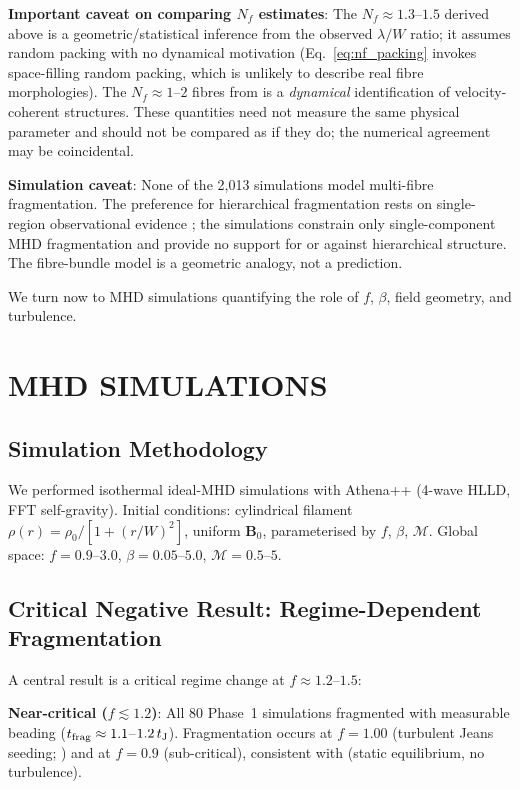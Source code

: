 \documentclass[twoside,twocolumn]{mnras}
\begin{document}
\textbf{Important caveat on comparing $N_f$ estimates}: The $N_f \approx 1.3$--$1.5$
derived above is a geometric/statistical inference from the observed $\lambda/W$ ratio;
it assumes random packing with no dynamical motivation (Eq.~\ref{eq:nf_packing}
invokes space-filling random packing, which is unlikely to describe real fibre
morphologies). The $N_f \approx 1$--$2$ fibres from \citet{Hacar2018} is a
\textit{dynamical} identification of velocity-coherent structures. These quantities
need not measure the same physical parameter and should not be compared as if
they do; the numerical agreement may be coincidental.

\textbf{Simulation caveat}: None of the 2,013 simulations model multi-fibre
fragmentation. The preference for hierarchical fragmentation rests on single-region
observational evidence \citep{Yang2024}; the simulations constrain only
single-component MHD fragmentation and provide no support for or against hierarchical
structure. The fibre-bundle model is a geometric analogy, not a prediction.

We turn now to MHD simulations quantifying the role of $f$, $\beta$, field geometry,
and turbulence.

\section{MHD SIMULATIONS}

\subsection{Simulation Methodology}

We performed isothermal ideal-MHD simulations with Athena++ \citep{Stone2020}
(4-wave HLLD, FFT self-gravity). Initial conditions: cylindrical filament
$\rho(r) = \rho_0/[1+(r/W)^2]$, uniform $\mathbf{B}_0$, parameterised by $f$, $\beta$,
$\mathcal{M}$. Global space: $f=0.9$--$3.0$, $\beta=0.05$--$5.0$, $\mathcal{M}=0.5$--$5$.

\subsection{Critical Negative Result: Regime-Dependent Fragmentation}
\label{sec:critnat}

A central result is a critical regime change at $f \approx 1.2$--$1.5$:

\textbf{Near-critical ($f \lesssim 1.2$)}: All 80 Phase~1 simulations fragmented with
measurable beading ($t_{\rm frag} \approx 1.1$--$1.2\,t_{\rm J}$). Fragmentation occurs
at $f = 1.00$ (turbulent Jeans seeding; \citealt{Padoan2011}) and at $f = 0.9$
(sub-critical), consistent with \citet{Ostriker1964} (static equilibrium, no turbulence).
\end{document}
